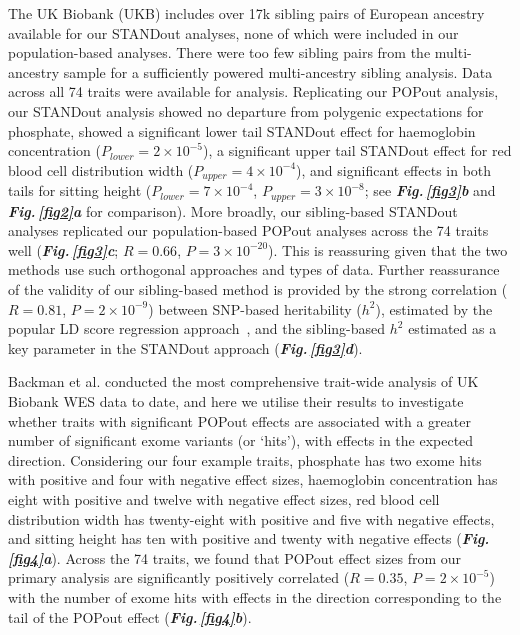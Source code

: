 \documentclass[12pt]{zHenriquesLab-StyleBioRxiv}
\newcommand\dref[2]{\normalsize{\textbf{\textit{Fig.\,\ref{#1}#2}}}\normalsize{}}
\begin{document}
{{The UK Biobank (UKB) includes over 17k sibling pairs of European ancestry available for our STANDout analyses, 
none of which were included in our population-based analyses. There were too few sibling pairs from the 
multi-ancestry sample for a sufficiently powered multi-ancestry sibling analysis. 
Data across all 74 traits were available for analysis. Replicating our POPout analysis, 
our STANDout analysis showed no departure from polygenic expectations for phosphate, showed 
a significant lower tail STANDout effect for haemoglobin concentration ($P_{lower}=2 \times 10^{-5}$), a 
significant upper tail STANDout effect for red blood cell distribution width ($P_{upper}=4 \times 10^{-4}$), 
and significant effects in both tails for sitting height 
($P_{lower}=7 \times 10^{-4}$, $P_{upper}=3 \times 10^{-8}$; see \dref{fig3}{b} and \dref{fig2}{a} for comparison). 
More broadly, our sibling-based STANDout analyses replicated our population-based POPout analyses across 
the 74 traits well (\dref{fig3}{c}; $R = 0.66$, $P = 3 \times 10^{-20}$). This is reassuring given that the 
two methods use such orthogonal approaches and types of data. Further reassurance of the validity of our 
sibling-based method is provided by the strong correlation ($R = 0.81$, $P = 2 \times 10^{-9}$) between 
SNP-based heritability ($h^2$), estimated by the popular LD score regression approach~\cite{BulikSullivan2015}, 
and the sibling-based $h^2$ estimated as a key parameter in the STANDout approach \cite{Souaiaia2024}  (\dref{fig3}{d}).

%
{} Backman et al. \cite{Backman2021} conducted 
the most comprehensive trait-wide analysis of UK Biobank 
WES data to date, and here we utilise their 
results to investigate whether traits with significant POPout 
effects are associated with a greater number of significant 
exome variants (or ‘hits’), with effects in the expected 
direction. Considering our four example traits, phosphate has
two exome hits with positive and four with negative 
effect sizes, haemoglobin concentration has eight with 
positive and twelve with negative effect sizes, red blood 
cell distribution width has twenty-eight with positive and 
five with negative effects, and sitting height has ten with 
positive and twenty with negative effects (\dref{fig4}{a}). 
Across the 74 traits, we found that POPout effect sizes from 
our primary analysis are significantly positively 
correlated ($R=0.35$, $P=2\times10^{-5}$) with the 
number of exome hits with effects in the direction 
corresponding to the tail of the POPout 
effect (\dref{fig4}{b}). 

}}
\end{document}
